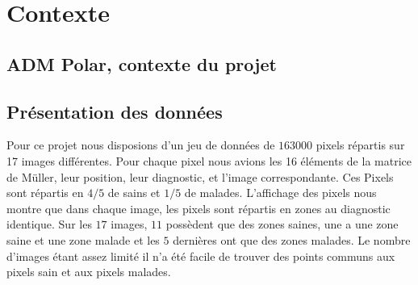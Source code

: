 \documentclass[a4paper,10pt]{report}
\begin{document}
\chapter{Contexte}
\section{ADM Polar, contexte du projet}
\section{Présentation des données}
Pour ce projet nous disposions d'un jeu de données de $163 000$ pixels répartis sur 17 images différentes. Pour chaque pixel nous avions les 16 éléments de la matrice de Müller, leur position, leur diagnostic, et l'image correspondante.
Ces Pixels sont répartis en $4/5$ de sains et $1/5$ de malades. L'affichage des pixels nous montre que dans chaque image, les pixels sont répartis en zones au diagnostic identique. Sur les $17$ images, $11$ possèdent que des zones saines, une a une zone saine et une zone malade et les $5$ dernières ont que des zones malades. Le nombre d'images étant assez limité il n'a été facile de trouver des points communs aux pixels sain et aux pixels malades.
\end{document}
